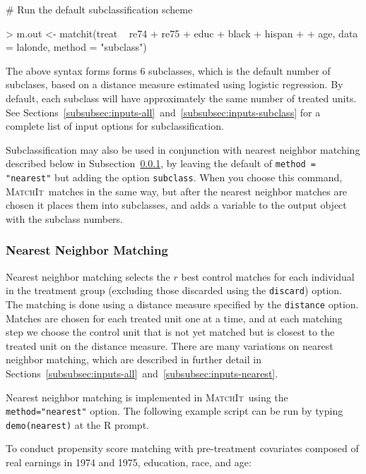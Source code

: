 \documentclass[oneside,letterpaper,titlepage]{article}
\newcommand{\MatchIt}{\textsc{MatchIt}}
\begin{document}
\noindent \# Run the default subclassification scheme
\begin{Schunk}
\begin{Sinput}
> m.out <- matchit(treat ~ re74 + re75 + educ + black + hispan + 
+     age, data = lalonde, method = "subclass")
\end{Sinput}
\end{Schunk}

The above syntax forms forms 6 subclasses, which is the default number
of subclases, based on a distance measure estimated using logistic
regression.  By default, each subclass will have approximately the
same number of treated units.  See
Sections~\ref{subsubsec:inputs-all}~and~\ref{subsubsec:inputs-subclass}
for a complete list of input options for subclassification.

Subclassification may also be used in conjunction with nearest
neighbor matching described below in
Subsection~\ref{subsubsec:nearest}, by leaving the default
of \texttt{method = "nearest"} but adding the option
\texttt{subclass}.  When you choose this command, \MatchIt\ matches in
the same way, but after the nearest neighbor matches are chosen it places them into
subclasses, and adds a variable to the output 
object with the subclass numbers.

\subsubsection{Nearest Neighbor Matching}
\label{subsubsec:nearest}

Nearest neighbor matching selects the $r$ best control matches for
each individual in the treatment group (excluding those discarded
using the \texttt{discard}) option.  The matching is done using a
distance measure specified by the {\tt distance} option. Matches are
chosen for each treated unit one at a time, and at each matching step
we choose the control unit that is not yet matched but is closest to
the treated unit on the distance measure.  There are many variations
on nearest neighbor matching, which are described in further detail in
Sections~\ref{subsubsec:inputs-all}~and~\ref{subsubsec:inputs-nearest}.

Nearest neighbor matching is implemented in \MatchIt\ using the
\texttt{method="nearest"} option.  The following example script can be
run by typing {\tt demo(nearest)} at the R prompt.

To conduct propensity score matching with pre-treatment covariates
composed of real earnings in 1974 and 1975, education, race, and age:
\end{document}

